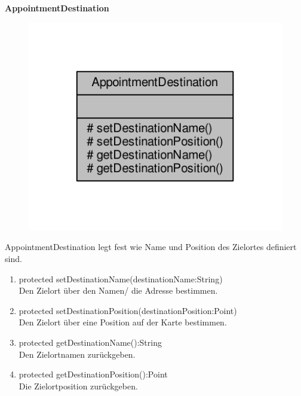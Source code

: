 \textbf{AppointmentDestination}
\begin{figure}[H]
	\includegraphics[scale = 1]{res/umlClasses/appointment_destination__coll__graph.pdf}
	\centering
\end{figure}
AppointmentDestination legt fest wie Name und Position des Zielortes definiert sind.
\begin{enumerate}
	\item protected setDestinationName(destinationName:String)\\
		Den Zielort über den Namen/ die Adresse bestimmen.
	\item protected setDestinationPosition(destinationPosition:Point)\\
		Den Zielort über eine Position auf der Karte bestimmen.
	\item protected getDestinationName():String \\
		Den Zielortnamen zurückgeben.
	\item protected getDestinationPosition():Point \\
		Die Zielortposition zurückgeben.
\end{enumerate}

